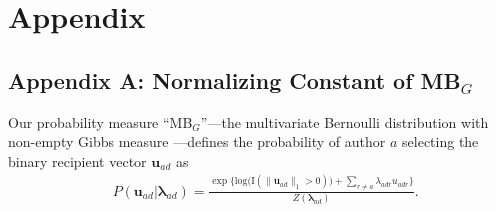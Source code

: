 \documentclass[ba]{imsart}
\numberwithin{equation}{section}
\theoremstyle{plain}
\begin{document}
\section*{Appendix}
	\subsection*{Appendix A: Normalizing Constant of MB$_{G}$}\label{subsec: non-empty Gibbs measure}
	Our probability measure ``MB$_{G}$''---the multivariate Bernoulli distribution with non-empty Gibbs measure \citep{fellows2017removing}---defines the probability of author $a$ selecting the binary recipient vector $\boldsymbol{u}_{ad}$ as
	\begin{equation*} 
	\begin{aligned}
	& P(\boldsymbol{u}_{ad}|\boldsymbol{\lambda}_{ad} ) = \frac{\exp\Big\{ \mbox{log}\big(\text{I}(\lVert \boldsymbol{u}_{ad} \rVert_1 > 0)\big) + \sum_{r \neq a} \lambda_{adr}u_{adr} \Big\}}{Z(\boldsymbol{\lambda}_{ad})}.
	\end{aligned}
	\end{equation*}
	
\end{document}
